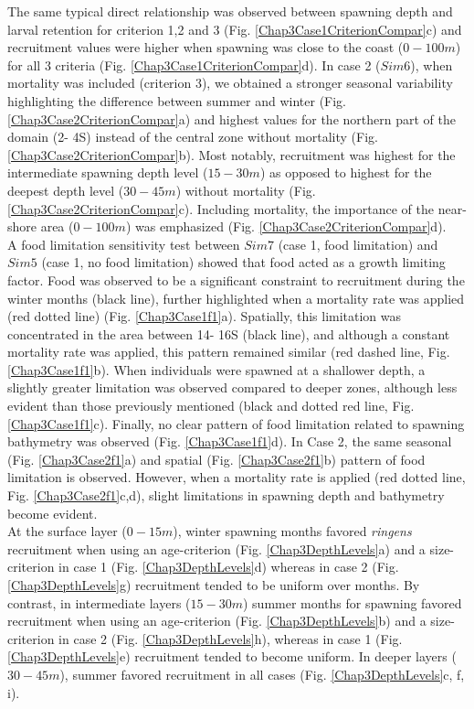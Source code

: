 The same typical direct relationship was observed between spawning depth and larval retention for criterion 1,2 and 3 (Fig. \ref{Chap3Case1CriterionCompar}c) and recruitment values were higher when spawning was close to the coast ($0 - 100 m$) for all 3 criteria (Fig. \ref{Chap3Case1CriterionCompar}d). In case 2 ($Sim 6$), when mortality was included (criterion 3), we obtained a stronger seasonal variability highlighting the difference between summer and winter (Fig. \ref{Chap3Case2CriterionCompar}a) and highest values for the northern part of the domain (2\textdegree - 4\textdegree S) instead of the central zone without mortality (Fig. \ref{Chap3Case2CriterionCompar}b). Most notably, recruitment was highest for the intermediate spawning depth level ($15 - 30 m$) as opposed to highest for the deepest depth level ($30 - 45 m$) without mortality (Fig. \ref{Chap3Case2CriterionCompar}c). Including mortality, the importance of the near-shore area ($0 - 100 m$) was emphasized (Fig. \ref{Chap3Case2CriterionCompar}d).\\

A food limitation sensitivity test between $Sim 7$ (case 1, food limitation) and $Sim 5$ (case 1, no food limitation) showed that food acted as a growth limiting factor. Food was observed to be a significant constraint to recruitment during the winter months (black line), further highlighted when a mortality rate was applied (red dotted line) (Fig. \ref{Chap3Case1f1}a). Spatially, this limitation was concentrated in the area between 14\textdegree - 16\textdegree S (black line), and although a constant mortality rate was applied, this pattern remained similar (red dashed line, Fig. \ref{Chap3Case1f1}b). When individuals were spawned at a shallower depth, a slightly greater limitation was observed compared to deeper zones, although less evident than those previously mentioned (black and dotted red line, Fig. \ref{Chap3Case1f1}c). Finally, no clear pattern of food limitation related to spawning bathymetry was observed (Fig. \ref{Chap3Case1f1}d). In Case 2, the same seasonal (Fig. \ref{Chap3Case2f1}a) and spatial (Fig. \ref{Chap3Case2f1}b) pattern of food limitation is observed. However, when a mortality rate is applied (red dotted line, Fig. \ref{Chap3Case2f1}c,d), slight limitations in spawning depth and bathymetry become evident.\\

At the surface layer ($0 - 15 m$), winter spawning months favored \textit{\gls{ringens}} recruitment when using an age-criterion (Fig. \ref{Chap3DepthLevels}a) and a size-criterion in case 1 (Fig. \ref{Chap3DepthLevels}d) whereas in case 2 (Fig. \ref{Chap3DepthLevels}g) recruitment tended to be uniform over months. By contrast, in intermediate layers ($15 - 30 m$) summer months for spawning favored recruitment when using an age-criterion (Fig. \ref{Chap3DepthLevels}b) and a size-criterion in case 2 (Fig. \ref{Chap3DepthLevels}h), whereas in case 1 (Fig. \ref{Chap3DepthLevels}e) recruitment tended to become uniform. In deeper layers ($30 - 45 m$), summer favored recruitment in all cases (Fig. \ref{Chap3DepthLevels}c, f, i).\\


